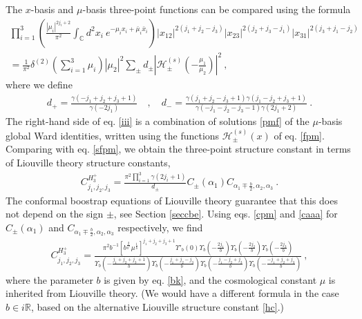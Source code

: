 \documentclass[12pt, a4paper, notitlepage, twoside]{report}
\numberwithin{equation}{section}
\theoremstyle{break}
\begin{document}
The $x$-basis and $\mu$-basis three-point functions can be compared using the formula \cite{rt05}
\begin{multline}
 \prod_{i=1}^3\left(\frac{|\mu_i|^{2j_i+2}}{\pi^2}\int_{{\mathbb{C}}}d^2x_i\ e^{-\mu_ix_i+\bar{\mu}_i\bar{x}_i}\right)
|x_{12}|^{2(j_1+j_2-j_3)} |x_{23}|^{2(j_2+j_3-j_1)} |x_{31}|^{2(j_3+j_1-j_2)} 
\\
= \frac{1}{\pi^2}\delta^{(2)}(\textstyle{\sum}_{i=1}^3\mu_i)|\mu_2|^2 \sum_\pm d_\pm \left|\mathcal{H}^{(s)}_\pm(-\tfrac{\mu_1}{\mu_2})\right|^2 \ ,
\label{iii}
\end{multline}
where we define 
\begin{align}
 d_+ = \frac{\gamma(-j_1+j_2+j_3+1)}{\gamma(-2j_1)} \quad , \quad d_- = \frac{\gamma(j_1+j_2-j_3+1)\gamma(j_1-j_2+j_3+1)}{\gamma(-j_1-j_2-j_3-1)\gamma(2j_1+2)}\ .
\end{align}
The right-hand side of eq. \eqref{iii} is a combination of solutions \eqref{pmf} of the $\mu$-basis global Ward identities, written using the functions $\mathcal{H}^{(s)}_\pm(x)$ of eq. \eqref{fpm}.
Comparing with eq. \eqref{sfpm}, we obtain the three-point structure constant in terms of Liouville theory structure constants,
\begin{align}
 C^{H_3^+}_{j_1,j_2,j_3} = \frac{\pi^2\prod_{i=1}^3\gamma(2j_i+1)}{d_\pm}C_{\pm}(\alpha_1)C_{\alpha_1\mp \frac{b}{2},\alpha_2,\alpha_3}\ .
\end{align}
The conformal boostrap equations of Liouville theory guarantee that this does not depend on the sign $\pm$, see Section \ref{seccbe}.
Using eqs. \eqref{cpm} and \eqref{caaa} for $C_{\pm}(\alpha_1)$ and $C_{\alpha_1\mp \frac{b}{2},\alpha_2,\alpha_3}$ respectively, we find
\begin{align}
\boxed{C^{H_3^+}_{j_1,j_2,j_3} = \frac{\pi^2b^{-1}\left[b^{\frac{2}{b^2}}\mu^{\frac{1}{b}}\right]^{j_1+j_2+j_3+1} \Upsilon'_b(0)\Upsilon_b(-\frac{2j_1}{b})\Upsilon_b(-\frac{2j_2}{b})\Upsilon_b(-\frac{2j_3}{b})}
{\Upsilon_b(-\frac{j_1+j_2+j_3+1}{b})\Upsilon_b(-\frac{j_1+j_2-j_3}{b}) \Upsilon_b(-\frac{j_1-j_2+j_3}{b})\Upsilon_b(-\frac{-j_1+j_2+j_3}{b})}}\ ,
\label{chp}
\end{align}
where the parameter $b$ is given by eq. \eqref{bk}, and the cosmological constant $\mu$ is inherited from Liouville theory.
(We would have a different formula in the case $b\in i\mathbb{R}$, based on the alternative Liouville structure constant \eqref{hc}.)
\end{document}
